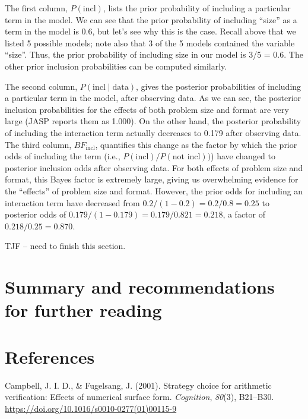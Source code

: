 \documentclass[english,,doc,floatsintext]{apa6}
\begin{document}
The first column, \(P(\text{incl})\), lists the prior probability of including a particular term in the model. We can see that the prior probability of including \enquote{size} as a term in the model is 0.6, but let's see why this is the case. Recall above that we listed 5 possible models; note also that 3 of the 5 models contained the variable \enquote{size}. Thus, the prior probability of including size in our model is 3/5 = 0.6. The other prior inclusion probabilities can be computed similarly.

The second column, \(P(\text{incl}\mid\text{data})\), gives the posterior probabilities of including a particular term in the model, after observing data. As we can see, the posterior inclusion probabilities for the effects of both problem size and format are very large (JASP reports them as 1.000). On the other hand, the posterior probability of including the interaction term actually decreases to 0.179 after observing data. The third column, \(BF_{\text{incl}}\), quantifies this change as the factor by which the prior odds of including the term (i.e., \(P(\text{incl})/P(\text{not incl}))\)) have changed to posterior inclusion odds after observing data. For both effects of problem size and format, this Bayes factor is extremely large, giving us overwhelming evidence for the \enquote{effects} of problem size and format. However, the prior odds for including an interaction term have decreased from \(0.2/(1-0.2) = 0.2/0.8 = 0.25\) to posterior odds of \(0.179/(1-0.179) = 0.179/0.821 = 0.218\), a factor of \(0.218/0.25 = 0.870\).

TJF -- need to finish this section.

\hypertarget{summary-and-recommendations-for-further-reading}{%
\section{Summary and recommendations for further reading}\label{summary-and-recommendations-for-further-reading}}

\newpage

\hypertarget{references}{%
\section{References}\label{references}}

\setlength{\parindent}{-0.5in}
\setlength{\leftskip}{0.5in}

\hypertarget{refs}{}
\leavevmode\hypertarget{ref-campbellFugelsang2001}{}%
Campbell, J. I. D., \& Fugelsang, J. (2001). Strategy choice for arithmetic verification: Effects of numerical surface form. \emph{Cognition}, \emph{80}(3), B21--B30. \url{https://doi.org/10.1016/s0010-0277(01)00115-9}
\end{document}
